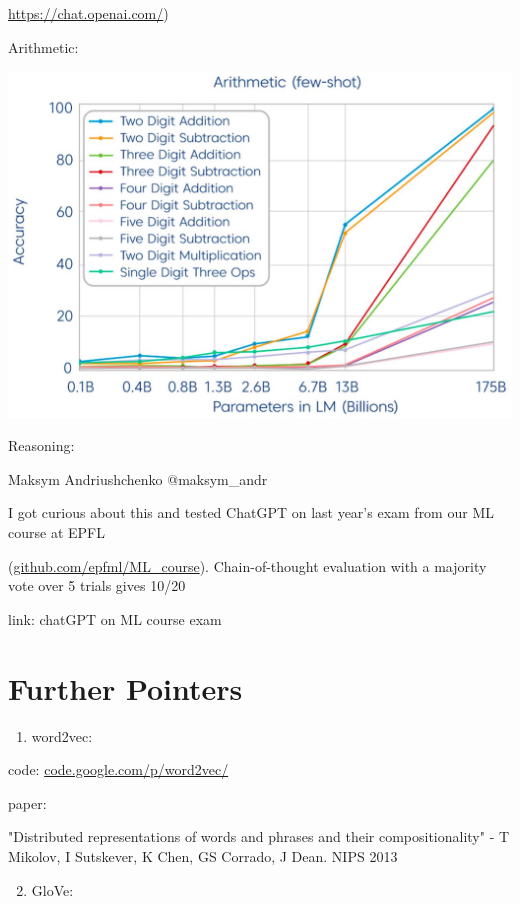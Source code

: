 \documentclass[10pt]{article}
\begin{document}
\href{https://chat.openai.com/}{https://chat.openai.com/})

Arithmetic:

\begin{center}
\includegraphics[max width=\textwidth]{2023_12_29_a68c38042b8470fb184bg-11}
\end{center}

Reasoning:

Maksym Andriushchenko @maksym\_andr

I got curious about this and tested ChatGPT on last year's exam from our ML course at EPFL

(\href{http://github.com/epfml/ML_course}{github.com/epfml/ML\_course}). Chain-of-thought evaluation with a majority vote over 5 trials gives 10/20

link: chatGPT on ML course exam

\section*{Further Pointers}
\begin{enumerate}
  \item word2vec:
\end{enumerate}

code: \href{http://code.google.com/p/word2vec/}{code.google.com/p/word2vec/}

paper:

"Distributed representations of words and phrases and their compositionality" - T Mikolov, I Sutskever, K Chen, GS Corrado, J Dean. NIPS 2013

\begin{enumerate}
  \setcounter{enumi}{1}
  \item GloVe:
\end{enumerate}
\end{document}

